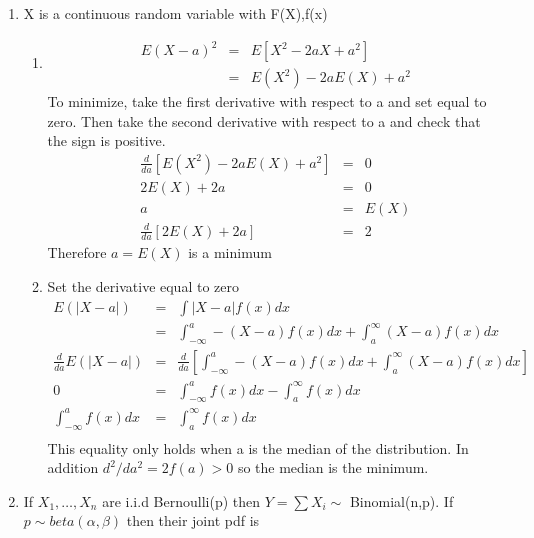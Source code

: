 \documentclass{article}
\begin{document}
\renewcommand{\vec}[1]{\mathbf{#1}}




\begin{enumerate}
  \item X is a continuous random variable with F(X),f(x)
    \begin{enumerate}
      \item \begin{eqnarray*}E(X-a)^2 &=& E[X^2 - 2aX + a^2]\\ &=& E(X^2) -2aE(X) + a^2\end{eqnarray*}
          To minimize, take the first derivative with respect to a and set equal to zero. Then take the second derivative with respect to a and check that the sign is positive.
            \begin{eqnarray*}\frac{d}{da}[E(X^2) - 2aE(X) + a^2] &=& 0 \\ 2E(X) + 2a &=& 0 \\ a &=& E(X)\\
            \frac{d}{da}[2E(X) + 2a] &=& 2 \end{eqnarray*}
            Therefore $a=E(X)$ is a minimum
      \item Set the derivative equal to zero
            \begin{eqnarray*}E(|X-a|) &=& \int|X-a|f(x)dx \\
                                      &=& \int_{-\infty}^a -(X-a)f(x)dx + \int_a^\infty (X-a)f(x)dx \\
                \frac{d}{da}E(|X-a|)  &=& \frac{d}{da}[\int_{-\infty}^a -(X-a)f(x)dx + \int_a^\infty (X-a)f(x)dx] \\
                                    0 &=& \int_{-\infty}^a f(x)dx - \int_a^\infty f(x)dx \\
              \int_{-\infty}^a f(x)dx &=& \int_a^\infty f(x)dx \\
                                      \end{eqnarray*}
            This equality only holds when a is the median of the distribution. In addition $d^2/da^2 = 2f(a) > 0$ so the median is the minimum.
    \end{enumerate}
  \item If $X_1,\dots,X_n$ are i.i.d Bernoulli(p) then $Y = \sum X_i \sim $ Binomial(n,p). If $p \sim beta(\alpha,\beta)$ then their joint pdf is

\end{enumerate}
\end{document}
